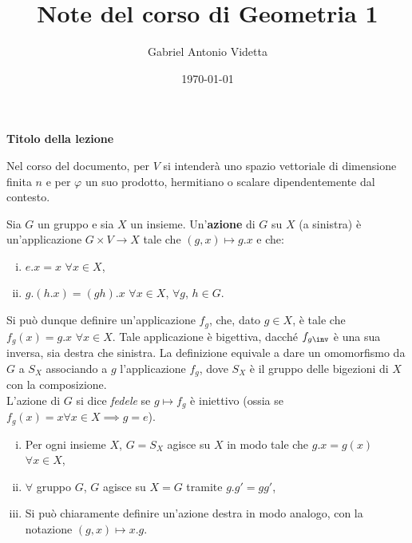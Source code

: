 \documentclass[11pt]{article}
\title{\textbf{Note del corso di Geometria 1}}
\author{Gabriel Antonio Videtta}
\date{\today}
\begin{document}
	
	\maketitle
	
	\begin{center}
		\Large \textbf{Titolo della lezione}
	\end{center}

	\begin{note}
		Nel corso del documento, per $V$ si intenderà uno spazio vettoriale di dimensione
		finita $n$ e per $\varphi$ un suo prodotto, hermitiano o scalare
		dipendentemente dal contesto.
	\end{note}

	\begin{definition} 
		Sia $G$ un gruppo e sia $X$ un insieme. Un'\textbf{azione} di $G$
		su $X$ (a sinistra) è un'applicazione $G \times V \to X$ tale
		che $(g, x) \mapsto g.x$ e che:
		
		\begin{enumerate}[(i)]
			\item $e.x = x$ $\forall x \in X$,
			\item $g.(h.x) = (gh).x$ $\forall x \in X$, $\forall g$, $h \in G$.
		\end{enumerate}
	\end{definition}

	Si può dunque definire un'applicazione $f_g$, che, dato $g \in X$,
	è tale che $f_g(x) = g.x$ $\forall x \in X$. Tale applicazione è
	bigettiva, dacché $f_{g\inv}$ è una sua inversa, sia destra che sinistra.
	La definizione equivale a dare un omomorfismo da $G$ a $S_X$ associando
	a $g$ l'applicazione $f_g$, dove $S_X$ è il gruppo delle bigezioni
	di $X$ con la composizione. \\
	
	L'azione di $G$ si dice \textit{fedele} se $g \mapsto f_g$ è iniettivo
	(ossia se $f_g(x) = x \forall x \in X \implies g=e$).
	
	\begin{enumerate}[(i)]
		\item Per ogni insieme $X$, $G = S_X$ agisce su $X$ in modo tale
		che $g.x = g(x)$ $\forall x \in X$,
		
		\item $\forall$ gruppo $G$, $G$ agisce su $X = G$ tramite
		$g.g' = gg'$,
		
		\item Si può chiaramente definire un'azione destra in modo
		analogo, con la notazione $(g, x) \mapsto x.g$.
	\end{enumerate}
\end{document}
